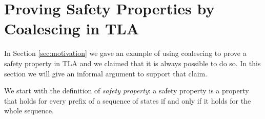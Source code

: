 \documentclass{easychair}
\newcommand{\init}{\texttt{INIT}}
\newcommand{\next}{\texttt{NEXT}}
\newtheorem{definition}[theorem]{Definition}
\begin{document}
\section{Proving Safety Properties by Coalescing in TLA}
\label{sec:safety}

%
%

In Section \ref{sec:motivation} we gave an example of using coalescing
to prove a safety property in TLA and we claimed that it is always
possible to do so. In this section we will give an informal argument
to support that claim.

%
%
%

We start with the definition of {\em safety property}: a safety
property is a property that holds for every prefix of
a sequence of states if and only if it holds for the whole sequence.
\end{document}
